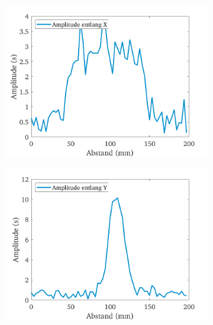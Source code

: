 \documentclass[../../main.tex]{subfiles}
\begin{document}
        \begin{figure}[H]
            \begin{subfigure}[c]{0.5\textwidth}
                \includegraphics[width=\linewidth]{Bilddateien/12/X/Fig_1}
                \label{fig:MRI_1D_X}
            \end{subfigure}
            \begin{subfigure}[c]{0.5\textwidth}
                \includegraphics[width=\linewidth]{Bilddateien/12/Y/Fig_1}
                \label{fig:MRI_1D_Y}
            \end{subfigure}
            \begin{subfigure}[c]{0.5\textwidth}

\end{subfigure}
\end{figure}
\end{document}

